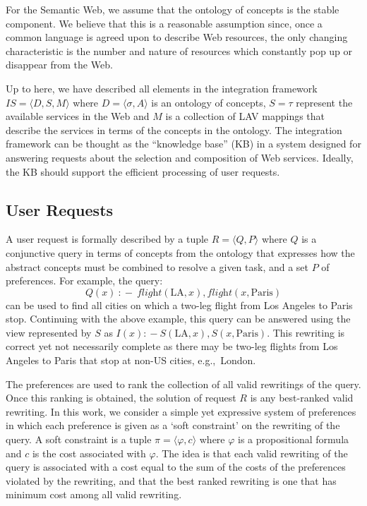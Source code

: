\documentclass{llncs}
\newcommand{\tup}[1]{\langle #1 \rangle}
\newcommand{\qrule}{:\!\!-}
\newcommand{\flight}{\textit{flight}}
\newcommand{\PA}{\text{Paris}}
\newcommand{\LA}{\text{LA}}
\begin{document}
For the Semantic Web, we assume that the ontology of concepts is the stable
component. We believe that this is a reasonable assumption since, once a
common language is agreed upon to describe Web resources, the only changing
characteristic is the number and nature of resources which constantly pop
up or disappear from the Web.

Up to here, we have described all elements in the integration framework
$IS=\tup{D,S,M}$ where $D=\tup{\sigma,A}$ is an ontology of concepts, 
$S=\tau$ represent the available services in the Web and $M$ is a
collection of LAV mappings that describe the services in terms of the
concepts in the ontology.
The integration framework can be thought as the ``knowledge base'' (KB)
in a system designed for answering requests about the selection and
composition of Web services.
Ideally, the KB should support the efficient processing of user requests.

\subsection{User Requests}

A user request is formally described by a tuple $R=\tup{Q,P}$
where $Q$ is a conjunctive query in terms of concepts from the
ontology that expresses how the abstract concepts must be 
combined to resolve a given task, and a set $P$ of preferences.
For example, the query:
\[ Q(x)\ \qrule\ \flight(\LA,x), \flight(x,\PA) \]
can be used to find all cities on which a two-leg flight
from Los Angeles to Paris stop. Continuing with the above example,
this query can be answered using the view represented by $S$
as $I(x) \qrule S(\LA,x), S(x,\PA)$. This rewriting is correct yet
not necessarily complete as there may be two-leg flights from
Los Angeles to Paris that stop at non-US cities, e.g.,\ London.

The preferences are used to rank the collection of all valid
rewritings of the query. Once this ranking is obtained, the solution
of request $R$ is any best-ranked valid rewriting.
In this work, we consider a simple yet expressive system of
preferences in which each preference is given as a 
`soft constraint' on the rewriting of the query.
A soft constraint is a tuple $\pi=\tup{\varphi,c}$ where $\varphi$
is a propositional formula and $c$ is the cost associated with $\varphi$.
The idea is that each valid rewriting of the query is associated with
a cost equal to the sum of the costs of the preferences violated by
the rewriting, and that the best ranked rewriting is one that has minimum
cost among all valid rewriting.
\end{document}
